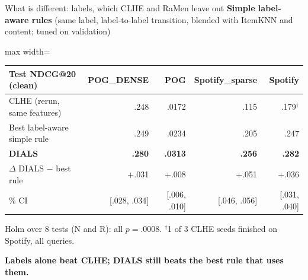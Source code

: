 \documentclass[10pt,aspectratio=169]{beamer}
\newcommand{\key}[1]{\textcolor{Accent}{\textbf{#1}}}
\newcommand{\fn}[1]{\textcolor{Muted}{\scriptsize #1}}
\begin{document}
\begin{frame}{What is different: labels, which CLHE and RaMen leave out}
\textbf{Simple label-aware rules} (same label, label-to-label transition, blended with ItemKNN and content; tuned on validation)\par
\vspace{3mm}
\centering\renewcommand{\arraystretch}{1.4}
\begin{adjustbox}{max width=\textwidth}\begin{tabular}{lrrrr}\toprule
Test NDCG@20 (clean) & POG\_DENSE & POG & Spotify\_sparse & Spotify\\\midrule
CLHE (rerun, same features) & .248 & .0172 & .115 & .179$^\dagger$\\
Best label-aware simple rule & .249 & .0234 & .205 & .247\\
\key{DIALS} & \textbf{.280} & \textbf{.0313} & \textbf{.256} & \textbf{.282}\\
$\Delta$ DIALS $-$ best rule & +.031 & +.008 & +.051 & +.036\\
\quad 95\% CI & [.028, .034] & [.006, .010] & [.046, .056] & [.031, .040]\\\bottomrule
\end{tabular}\end{adjustbox}\par
\raggedright\vspace{3mm}
\fn{Holm over 8 tests (N and R): all $p=.0008$. $^\dagger$1 of 3 CLHE seeds finished on Spotify, all queries.}\par
\vspace{3mm}
\key{Labels alone beat CLHE; DIALS still beats the best rule that uses them.}
\end{frame}

\end{document}
